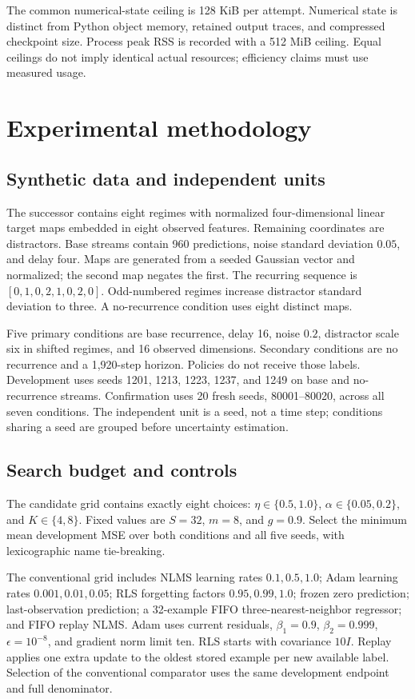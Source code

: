 \documentclass[10pt]{article}
\begin{document}
The common numerical-state ceiling is 128 KiB per attempt. Numerical state is distinct from Python object memory, retained output traces, and compressed checkpoint size. Process peak RSS is recorded with a 512 MiB ceiling. Equal ceilings do not imply identical actual resources; efficiency claims must use measured usage.

\section{Experimental methodology}
\subsection{Synthetic data and independent units}
The successor contains eight regimes with normalized four-dimensional linear target maps embedded in eight observed features. Remaining coordinates are distractors. Base streams contain 960 predictions, noise standard deviation $0.05$, and delay four. Maps are generated from a seeded Gaussian vector and normalized; the second map negates the first. The recurring sequence is $[0,1,0,2,1,0,2,0]$. Odd-numbered regimes increase distractor standard deviation to three. A no-recurrence condition uses eight distinct maps.

Five primary conditions are base recurrence, delay 16, noise $0.2$, distractor scale six in shifted regimes, and 16 observed dimensions. Secondary conditions are no recurrence and a 1,920-step horizon. Policies do not receive those labels. Development uses seeds 1201, 1213, 1223, 1237, and 1249 on base and no-recurrence streams. Confirmation uses 20 fresh seeds, 80001--80020, across all seven conditions. The independent unit is a seed, not a time step; conditions sharing a seed are grouped before uncertainty estimation.

\subsection{Search budget and controls}
The candidate grid contains exactly eight choices: $\eta\in\{0.5,1.0\}$, $\alpha\in\{0.05,0.2\}$, and $K\in\{4,8\}$. Fixed values are $S=32$, $m=8$, and $g=0.9$. Select the minimum mean development MSE over both conditions and all five seeds, with lexicographic name tie-breaking.

The conventional grid includes NLMS learning rates $0.1,0.5,1.0$; Adam learning rates $0.001,0.01,0.05$; RLS forgetting factors $0.95,0.99,1.0$; frozen zero prediction; last-observation prediction; a 32-example FIFO three-nearest-neighbor regressor; and FIFO replay NLMS. Adam uses current residuals, $\beta_1=0.9$, $\beta_2=0.999$, $\epsilon=10^{-8}$, and gradient norm limit ten. RLS starts with covariance $10I$. Replay applies one extra update to the oldest stored example per new available label. Selection of the conventional comparator uses the same development endpoint and full denominator.
\end{document}
